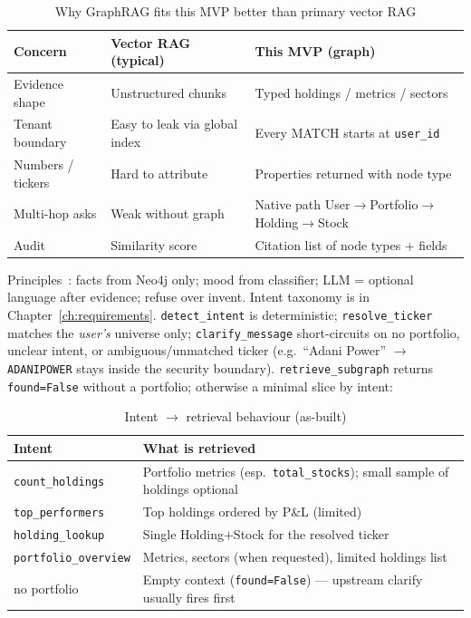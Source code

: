 \begin{table}[!htbp]
\centering
\small
\caption{Why GraphRAG fits this MVP better than primary vector RAG}
\label{tab:graphrag-vs-vector}
\begin{tabularx}{\textwidth}{@{}
  >{\raggedright\arraybackslash}p{}
  >{\raggedright\arraybackslash}p{}
  >{\raggedright\arraybackslash}X
  @{}}
\toprule
\textbf{Concern} & \textbf{Vector RAG (typical)} & \textbf{This MVP (graph)} \\
\midrule
Evidence shape & Unstructured chunks & Typed holdings / metrics / sectors \\
\addlinespace
Tenant boundary & Easy to leak via global index & Every MATCH starts at \texttt{user\_id} \\
\addlinespace
Numbers / tickers & Hard to attribute & Properties returned with node type \\
\addlinespace
Multi-hop asks & Weak without graph & Native path User$\rightarrow$Portfolio$\rightarrow$Holding$\rightarrow$Stock \\
\addlinespace
Audit & Similarity score & Citation list of node types + fields \\
\bottomrule
\end{tabularx}
\end{table}

\noindent
Principles~\cite{trd}: facts from Neo4j only; mood from classifier; LLM = optional language after evidence; refuse over invent. Intent taxonomy is in Chapter~\ref{ch:requirements}. \texttt{detect\_intent} is deterministic; \texttt{resolve\_ticker} matches the \emph{user's} universe only; \texttt{clarify\_message} short-circuits on no portfolio, unclear intent, or ambiguous/unmatched ticker (e.g.\ ``Adani Power'' $\rightarrow$ \texttt{ADANIPOWER} stays inside the security boundary). \texttt{retrieve\_subgraph} returns \texttt{found=False} without a portfolio; otherwise a minimal slice by intent:

\begin{table}[!htbp]
\centering
\small
\caption{Intent $\rightarrow$ retrieval behaviour (as-built)}
\label{tab:retrieve-by-intent}
\begin{tabularx}{\textwidth}{@{}
  >{\raggedright\arraybackslash}p{}
  >{\raggedright\arraybackslash}X
  @{}}
\toprule
\textbf{Intent} & \textbf{What is retrieved} \\
\midrule
\texttt{count\_holdings} & Portfolio metrics (esp.\ \texttt{total\_stocks}); small sample of holdings optional \\
\addlinespace
\texttt{top\_performers} & Top holdings ordered by P\&L (limited) \\
\addlinespace
\texttt{holding\_lookup} & Single Holding$+$Stock for the resolved ticker \\
\addlinespace
\texttt{portfolio\_overview} & Metrics, sectors (when requested), limited holdings list \\
\addlinespace
no portfolio & Empty context (\texttt{found=False}) --- upstream clarify usually fires first \\
\bottomrule
\end{tabularx}
\end{table}

